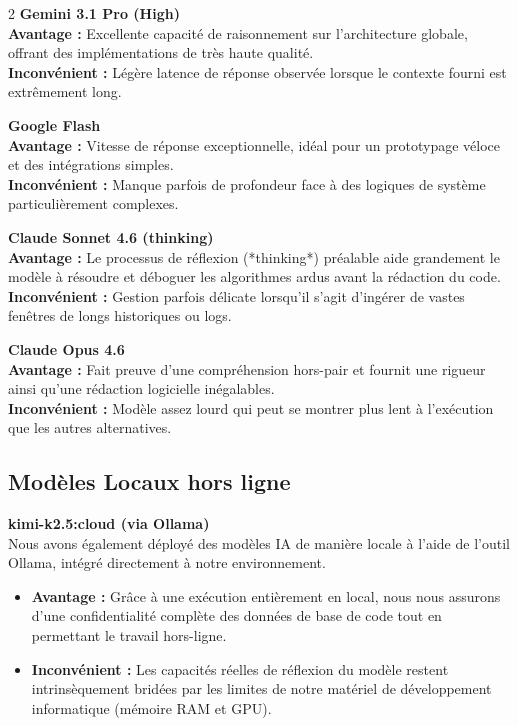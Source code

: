 \documentclass[12pt,a4paper]{article}
\begin{document}
\begin{multicols}{2}
\textbf{Gemini 3.1 Pro (High)} \\
\textbf{Avantage :} Excellente capacité de raisonnement sur l'architecture globale, offrant des implémentations de très haute qualité. \\
\textbf{Inconvénient :} Légère latence de réponse observée lorsque le contexte fourni est extrêmement long.\par
\vspace{0.3cm}

\textbf{Google Flash} \\
\textbf{Avantage :} Vitesse de réponse exceptionnelle, idéal pour un prototypage véloce et des intégrations simples. \\
\textbf{Inconvénient :} Manque parfois de profondeur face à des logiques de système particulièrement complexes.\par

\columnbreak

\textbf{Claude Sonnet 4.6 (thinking)} \\
\textbf{Avantage :} Le processus de réflexion (*thinking*) préalable aide grandement le modèle à résoudre et déboguer les algorithmes ardus avant la rédaction du code. \\
\textbf{Inconvénient :} Gestion parfois délicate lorsqu'il s'agit d'ingérer de vastes fenêtres de longs historiques ou logs.\par
\vspace{0.3cm}

\textbf{Claude Opus 4.6} \\
\textbf{Avantage :} Fait preuve d'une compréhension hors-pair et fournit une rigueur ainsi qu'une rédaction logicielle inégalables. \\
\textbf{Inconvénient :} Modèle assez lourd qui peut se montrer plus lent à l'exécution que les autres alternatives.
\end{multicols}

\subsection*{Modèles Locaux hors ligne}
\textbf{kimi-k2.5:cloud (via Ollama)} \\
Nous avons également déployé des modèles IA de manière locale à l'aide de l'outil Ollama, intégré directement à notre environnement.

\begin{itemize}[leftmargin=*]
    \item \textbf{Avantage :} Grâce à une exécution entièrement en local, nous nous assurons d'une confidentialité complète des données de base de code tout en permettant le travail hors-ligne.
    \item \textbf{Inconvénient :} Les capacités réelles de réflexion du modèle restent intrinsèquement bridées par les limites de notre matériel de développement informatique (mémoire RAM et GPU).
\end{itemize}
\end{document}
